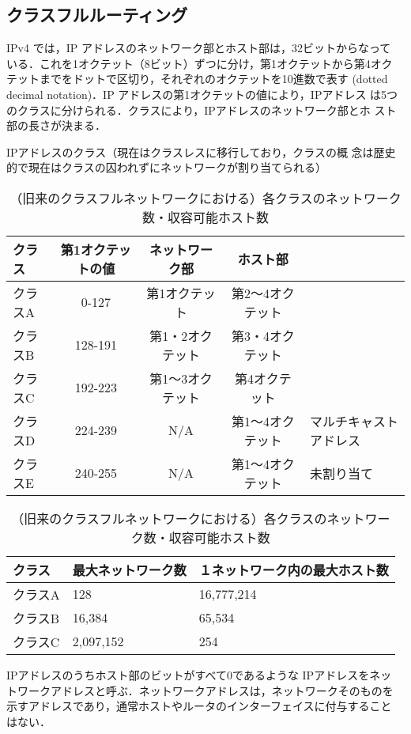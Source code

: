 \subsection{クラスフルルーティング}
IPv4 では，IP アドレスのネットワーク部とホスト部は，32ビットからなって
いる．これを1オクテット（8ビット）ずつに分け，第1オクテットから第4オク
テットまでをドットで区切り，それぞれのオクテットを10進数で表す (dotted
decimal notation)．IP アドレスの第1オクテットの値により，IPアドレス
は5つのクラスに分けられる．クラスにより，IPアドレスのネットワーク部とホ
スト部の長さが決まる．
\begin{table}[tb]
  \centering
  \caption{IPアドレスのクラス（現在はクラスレスに移行しており，クラスの概
 念は歴史的で現在はクラスの囚われずにネットワークが割り当てられる）}
  \label{tab:16:ipclass}	
  \begin{tabular}{l|c|c|c|l}
    \hline
    クラス & 第1オクテットの値 & ネットワーク部 & ホスト部 & \\
    \hline
    クラスA & 0-127 & 第1オクテット & 第2〜4オクテット & \\
    \hline
    クラスB & 128-191 & 第1・2オクテット & 第3・4オクテット & \\ 
    \hline
    クラスC & 192-223 & 第1〜3オクテット & 第4オクテット & \\
    \hline
    クラスD & 224-239 & N/A & 第1〜4オクテット & マルチキャストアドレス\\
    \hline
    クラスE & 240-255 & N/A & 第1〜4オクテット & 未割り当て\\
    \hline
  \end{tabular}

  \caption{（旧来のクラスフルネットワークにおける）各クラスのネットワーク数・収容可能ホスト数}
   \label{tab:16:numnethost}
  \begin{tabular}{l|l|l}
    \hline
    クラス & 最大ネットワーク数 & １ネットワーク内の最大ホスト数 \\
    \hline
    クラスA & 128 & 16,777,214\\
    \hline
    クラスB & 16,384 & 65,534\\
    \hline
    クラスC & 2,097,152 & 254\\
    \hline
  \end{tabular}
\end{table}

IPアドレスのうちホスト部のビットがすべて0であるような IPアドレスをネッ
トワークアドレスと呼ぶ．ネットワークアドレスは，ネットワークそのものを
示すアドレスであり，通常ホストやルータのインターフェイスに付与すること
はない．

